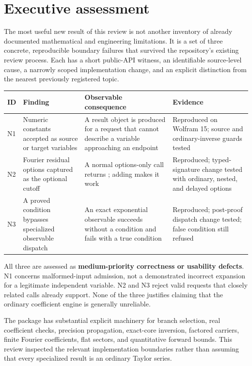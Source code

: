 \documentclass[11pt,letterpaper]{article}
\newcommand{\code}[1]{\texttt{\detokenize{#1}}}
\begin{document}
\section{Executive assessment}

The most useful new result of this review is not another inventory of already documented mathematical and engineering limitations. It is a set of three concrete, reproducible boundary failures that survived the repository's existing review process. Each has a short public-API witness, an identifiable source-level cause, a narrowly scoped implementation change, and an explicit distinction from the nearest previously registered topic.

\begin{longtable}{@{}>{\raggedright\arraybackslash}p{}>{\raggedright\arraybackslash}p{}>{\raggedright\arraybackslash}p{}>{\raggedright\arraybackslash}p{}@{}}
\toprule
ID & Finding & Observable consequence & Evidence\\
\midrule\endhead
N1 & Numeric constants accepted as source or target variables & A result object is produced for a request that cannot describe a variable approaching an endpoint & Reproduced on Wolfram 15; source and ordinary-inverse guards tested\\[0.6em]
N2 & Fourier residual options captured as the optional cutoff & A normal options-only call returns \code{InvalidCutoff}; adding \code{Automatic} makes it work & Reproduced; typed-signature change tested with ordinary, nested, and delayed options\\[0.6em]
N3 & A proved condition bypasses specialized observable dispatch & An exact exponential observable succeeds without a condition and fails with a true condition & Reproduced; post-proof dispatch change tested; false condition still refused\\
\bottomrule
\end{longtable}

All three are assessed as \textbf{medium-priority correctness or usability defects}. N1 concerns malformed-input admission, not a demonstrated incorrect expansion for a legitimate independent variable. N2 and N3 reject valid requests that closely related calls already support. None of the three justifies claiming that the ordinary coefficient engine is generally unreliable.

The package has substantial explicit machinery for branch selection, real coefficient checks, precision propagation, exact-core inversion, factored carriers, finite Fourier coefficients, flat sectors, and quantitative forward bounds. This review inspected the relevant implementation boundaries rather than assuming that every specialized result is an ordinary Taylor series.\cite{main,operations,fourier,core,flat,dirichlet}
\end{document}
